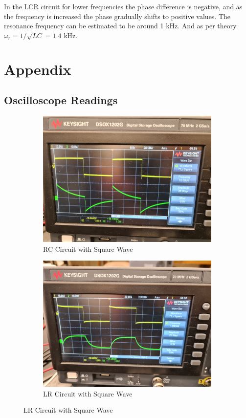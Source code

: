 \documentclass[a4paper,12pt]{article}
\begin{document}
In the LCR circuit for lower frequencies the phase difference is negative, and as the frequency is 
increased the phase gradually shifts to positive values. The resonance frequency can be estimated to be around 1 kHz. 
And as per theory $\omega_r = 1/\sqrt{LC} = 1.4$ kHz.

\pagebreak

\appendix

\section{Appendix}

\subsection{Oscilloscope Readings}

\begin{figure}[H]
  \centering
  \begin{subfigure}{.5\textwidth}
    \centering
    \includegraphics[width=.9\linewidth]{../data/20211116_104029.jpg}
    \caption{RC Circuit with Square Wave}
  \end{subfigure}%
  \begin{subfigure}{.5\textwidth}
    \centering
    \includegraphics[width=.9\linewidth]{../data/20211116_104711.jpg}
    \caption{LR Circuit with Square Wave}
  \end{subfigure}
\end{figure}
\end{document}
